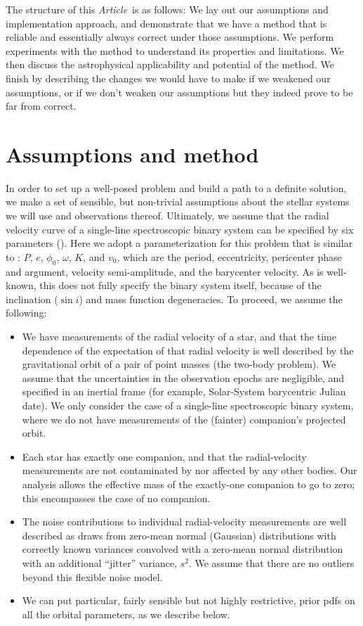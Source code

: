 \documentclass[manuscript, letterpaper]{aastex6}
\newcommand{\documentname}{\textsl{Article}}
\begin{document}
The structure of this \documentname\ is as follows:
We lay out our assumptions and implementation approach, and demonstrate that we
have a method that is reliable and essentially always correct under
those assumptions.
We perform experiments with the method to understand its properties and
limitations.
We then discuss the astrophysical applicability and potential of the
method.
We finish by describing the changes we would have to make if we weakened our assumptions, or
if we don't weaken our assumptions but they indeed prove to be far from correct.

\section{Assumptions and method} \label{sec:method}

In order to set up a well-posed problem and build a path to a definite solution,
we make a set of sensible, but non-trivial assumptions about the stellar systems we will use
and observations thereof.
Ultimately, we assume that the radial velocity curve of a single-line
spectroscopic binary system can be specified by six parameters
(\citealt{Kepler:1609}).
Here we adopt a parameterization for this problem that is similar to
\citealt{Murray:2010}:
$P$, $e$, $\phi_0$, $\omega$, $K$, and $v_0$, which are the period,
eccentricity, pericenter phase and argument, velocity semi-amplitude, and the
barycenter velocity.
As is well-known, this does not fully specify the binary system itself, because
of the inclination ($\sin{i}$) and mass function degeneracies.
To proceed, we assume the following:
\begin{itemize}\itemsep0ex  %
\item We have measurements of the radial velocity of a
  star, and that the time dependence of the expectation of that radial
  velocity is well described by the gravitational orbit of a pair of
  point masses (the two-body problem). We assume that the uncertainties
  in the observation epochs are negligible, and specified in an inertial frame (for
  example, Solar-System barycentric Julian date).
  We only consider the case of a single-line spectroscopic binary system,
  where we do not have measurements of the (fainter) companion's projected orbit.
\item  Each star has exactly one companion, and that the radial-velocity
  measurements are not contaminated by nor affected by any other bodies. Our
  analysis allows the effective mass of the exactly-one companion to go to zero;
  this encompasses the case of no companion.
\item The noise contributions to individual radial-velocity measurements are
  well described as draws from zero-mean normal (Gaussian) distributions with
  correctly known variances convolved with a zero-mean normal distribution with
  an additional ``jitter'' variance, $s^2$. We assume that there are no outliers
  beyond this flexible noise model.
\item We can put particular, fairly sensible but not highly restrictive,
  prior pdfs on all the orbital parameters, as we
  describe below.
\end{itemize}
\end{document}
